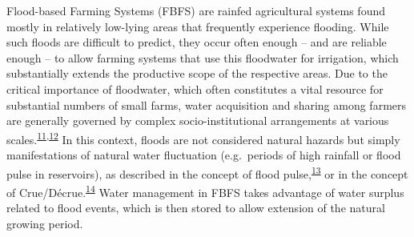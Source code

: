 \documentclass[]{elsarticle} %
\begin{document}
Flood-based Farming Systems (FBFS) are rainfed agricultural systems found mostly in relatively low-lying areas that frequently experience flooding. While such floods are difficult to predict, they occur often enough -- and are reliable enough -- to allow farming systems that use this floodwater for irrigation, which substantially extends the productive scope of the respective areas. Due to the critical importance of floodwater, which often constitutes a vital resource for substantial numbers of small farms, water acquisition and sharing among farmers are generally governed by complex socio-institutional arrangements at various scales.\textsuperscript{\protect\hyperlink{ref-Haile_2010}{11},\protect\hyperlink{ref-VanSteenbergen_et_al_2010}{12}} In this context, floods are not considered natural hazards but simply manifestations of natural water fluctuation (e.g.~periods of high rainfall or flood pulse in reservoirs), as described in the concept of flood pulse,\textsuperscript{\protect\hyperlink{ref-Junk_et_al_1989}{13}} or in the concept of Crue/Décrue.\textsuperscript{\protect\hyperlink{ref-Harlan_and_Pasquereau_1969}{14}} Water management in FBFS takes advantage of water surplus related to flood events, which is then stored to allow extension of the natural growing period.
\end{document}
